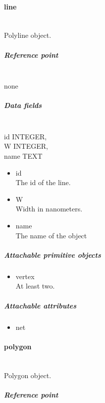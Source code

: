 \documentclass[12pt]{article}
\begin{document}
\paragraph{line}\label{line}

\mbox{}\\

Polyline object.

\subparagraph{Reference point}\label{reference-point-3}

\mbox{}\\

none

\subparagraph{Data fields}\label{data-fields-3}

\mbox{}\\

id INTEGER,\\W INTEGER,\\name TEXT

\begin{itemize}
\item
  id\\The id of the line.
\item
  W\\Width in nanometers.
\item
  name\\The name of the object
\end{itemize}

\subparagraph{Attachable primitive
objects}\label{attachable-primitive-objects-3}

\begin{itemize}
\itemsep1pt\parskip0pt
\item
  vertex\\At least two.
\end{itemize}

\subparagraph{Attachable attributes}\label{attachable-attributes-3}

\begin{itemize}
\itemsep1pt\parskip0pt
\item
  net
\end{itemize}

\paragraph{polygon}\label{polygon}

\mbox{}\\

Polygon object.

\subparagraph{Reference point}\label{reference-point-4}
\end{document}
